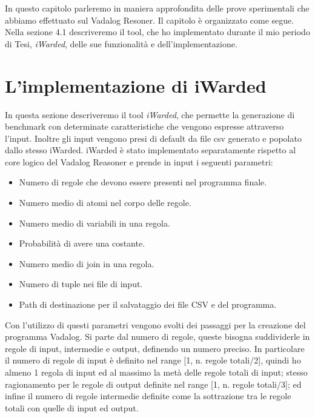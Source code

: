 In questo capitolo parleremo in maniera approfondita delle prove sperimentali che abbiamo effettuato sul Vadalog Resoner. \newline
Il capitolo è organizzato come segue. Nella sezione 4.1 descriveremo il tool, che ho implementato durante il mio periodo di Tesi, \emph{iWarded}, delle sue funzionalità e dell'implementazione. \newline

\section{L'implementazione di iWarded}

In questa sezione descriveremo il tool \emph{iWarded}, che permette la generazione di benchmark con determinate caratteristiche che vengono espresse attraverso l'input. Inoltre gli input vengono presi di default da file csv generato e popolato dallo stesso iWarded. \newline
iWarded è stato implementato separatamente rispetto al core logico del Vadalog Reasoner e prende in input i seguenti parametri: 
\begin{itemize}
	\item Numero di regole che devono essere presenti nel programma finale.
	\item Numero medio di atomi nel corpo delle regole.
	\item Numero medio di variabili in una regola.
	\item Probabilità di avere una costante.
	\item Numero medio di join in una regola.
	\item Numero di tuple nei file di input. 
	\item Path di destinazione per il salvataggio dei file CSV e del programma.
\end{itemize}
Con l'utilizzo di questi parametri vengono svolti dei passaggi per la creazione del programma Vadalog. \newline
Si parte dal numero di regole, queste bisogna suddividerle in regole di input, intermedie e output, definendo un numero preciso. In particolare il numero di regole di input è definito nel range [1, n. regole totali/2], quindi ho almeno 1 regola di input ed al massimo la metà delle regole totali di input; stesso ragionamento per le regole di output definite nel range [1, n. regole totali/3]; ed infine il numero di regole intermedie definite come la sottrazione tra le regole totali con quelle di input ed output. \newline
